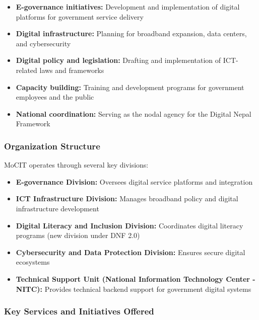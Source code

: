 \documentclass[12pt,a4paper]{article}
\begin{document}
\begin{itemize}
    \item \textbf{E-governance initiatives:} Development and implementation of digital platforms for government service delivery
    \item \textbf{Digital infrastructure:} Planning for broadband expansion, data centers, and cybersecurity
    \item \textbf{Digital policy and legislation:} Drafting and implementation of ICT-related laws and frameworks
    \item \textbf{Capacity building:} Training and development programs for government employees and the public
    \item \textbf{National coordination:} Serving as the nodal agency for the Digital Nepal Framework
\end{itemize}

\subsubsection{Organization Structure}

MoCIT operates through several key divisions:
\begin{itemize}
    \item \textbf{E-governance Division:} Oversees digital service platforms and integration
    \item \textbf{ICT Infrastructure Division:} Manages broadband policy and digital infrastructure development
    \item \textbf{Digital Literacy and Inclusion Division:} Coordinates digital literacy programs (new division under DNF 2.0)
    \item \textbf{Cybersecurity and Data Protection Division:} Ensures secure digital ecosystems
    \item \textbf{Technical Support Unit (National Information Technology Center - NITC):} Provides technical backend support for government digital systems
\end{itemize}

\subsubsection{Key Services and Initiatives Offered}
\end{document}

